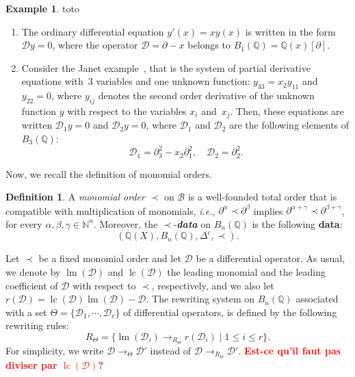 \documentclass[10pt]{easychair}
\theoremstyle{definition}
\newtheorem{definition}[theorem]{Definition}
\newtheorem{example}[theorem]{Example}
\newcommand\ie{\emph{i.e.}}
\newcommand\todo[1]{{\bf\textcolor{red}{#1}}}
\newcommand\data{{\color{red}\bf data}}
\newcommand\D{\mathcal{D}}
\DeclareMathOperator{\lm}{lm}
\DeclareMathOperator{\lc}{lc}
\newcommand\basis{\mathscr{B}}
\newcommand\Q{\mathbb{Q}}
\newcommand\N{\mathbb{N}}
\newcommand\Weyl[1]{B_{#1}(\Q)}
\newcommand\rewTheta{\to_{\Theta}}
\begin{document}
\begin{example}\label{ex:diff_operators_init}
  {\color{white}toto}
  \begin{enumerate}
  \item The ordinary differential equation $y'(x)=xy(x)$ is written in
    the form $\D y=0$, where the operator $\D=\partial-x$ belongs to
    $\Weyl{1}=\Q(x)[\partial]$.
  \item\label{it:Janet_example_init} Consider the Janet
    example~\cite{MR3532888}, that is the system of partial derivative
    equations with~$3$ variables and one unknown function:
    $y_{33}=x_2y_{11}$ and $y_{22}=0$, where $y_{ij}$ denotes the second
    order derivative of the unknown function $y$ with respect to the
    variables $x_i$ and~$x_j$. Then, these equations are written
    $\D_1y=0$ and $\D_2y=0$, where $\D_1$ and $\D_2$ are the following
    elements of $\Weyl{3}$:
    \[\D_1=\partial_3^2-x_2\partial_1^2,\quad \D_2=\partial_2^2.\]
  \end{enumerate}
\end{example}
\smallskip

Now, we recall the definition of monomial orders.
\smallskip

\begin{definition}
  A {\em monomial order} $\prec$ on $\basis$ is a well-founded total
  order that is compatible with multiplication of monomials, \ie,
  $\partial^{\alpha}\prec\partial^{\beta}$ implies 
  $\partial^{\alpha+\gamma}\prec\partial^{\beta+\gamma}$, for every
  $\alpha,\beta,\gamma\in\N^n$. Moreover, the $\prec$-{\it \data} on
  $\Weyl{n}$ is the following \data:
  \[(\Q(X),\Weyl{n},\Delta^c,\prec).\]
\end{definition}
\smallskip

Let $\prec$ be a fixed monomial order and let $\D$ be a differential
operator. As usual, we denote by $\lm(\D)$ and $\lc(\D)$ the leading
monomial and the leading coefficient of $\D$ with respect to $\prec$,
respectively, and we also let $r(\D)=\lc(\D)\lm(\D)-\D$. The rewriting
system on $\Weyl{n}$ associated with a set $\Theta=\{\D_1,\cdots,\D_r\}$
of differential operators, is defined by the following rewriting rules:
\[R_{\Theta}=\Big\{\lm(\D_i)\to_{R_\Theta}r(\D_i)\mid 1\leq i\leq r
\Big\}.\]
For simplicity, we write $\D\rewTheta\D'$ instead of
$\D\to_{R_\Theta}\D'$. \todo{Est-ce qu'il faut pas diviser par $\lc(\D)$?}
\smallskip
\end{document}
